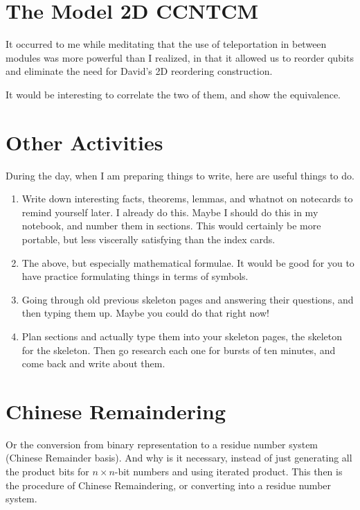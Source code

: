 \documentclass{article}
\begin{document}
\section{The Model 2D CCNTCM}

It occurred to me while meditating that the use of teleportation in
between modules was more powerful than I realized, in that it allowed
us to reorder qubits and eliminate the need for David's 2D reordering
construction.

It would be interesting to correlate the two of them, and show the 
equivalence.

\section{Other Activities}

During the day, when I am preparing things to write, here are useful
things to do.

\begin{enumerate}
\item
Write down interesting facts, theorems, lemmas, and whatnot on notecards
to remind yourself later. I already do this. Maybe I should do this in
my notebook, and number them in sections. This would certainly be more
portable, but less viscerally satisfying than the index cards.

\item
The above, but especially mathematical formulae. It would be good for you
to have practice formulating things in terms of symbols.

\item
Going through old previous skeleton pages and answering their questions,
and then typing them up. Maybe you could do that right now!

\item
Plan sections and actually type them into your skeleton pages, the skeleton
for the skeleton. Then go research each one for bursts of ten minutes,
and come back and write about them.

\end{enumerate}

\section{Chinese Remaindering}

Or the conversion from binary representation to a residue number system
(Chinese Remainder basis). And why is it necessary, instead of
just generating all the product bits for $n\times n$-bit numbers and
using iterated product. This then is the procedure of Chinese Remaindering,
or converting into a residue number system.
\end{document}
